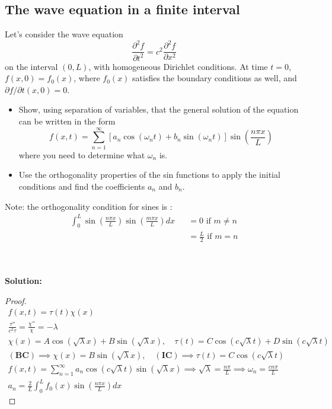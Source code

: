  \subsection{The wave equation in a finite interval}

 Let's consider the wave equation 
\begin{equation}
    \frac{\partial^2 f}{\partial t^2} = c^2 \frac{\partial^2 f}{\partial x^2}
    \label{eq:waveeq}
\end{equation}
on the interval $(0,L)$, with homogeneous Dirichlet conditions. At time $t= 0$, $f(x,0) = f_0(x)$, where $f_0(x)$ satisfies the boundary conditions as well, and $\partial f/\partial t(x,0) = 0$. 

\begin{itemize}
\item Show, using separation of variables, that the general solution of the equation can be written in the form
\begin{equation}
f(x,t) =  \sum_{n=1}^\infty \left[ a_n \cos(\omega_n t) + b_n \sin(\omega_n t)\right] \sin \left( \frac{n\pi x}{L} \right) 
\end{equation} 
where you need to determine what $\omega_n$ is. 
\item Use the orthogonality properties of the sin functions to apply the initial conditions and find the coefficients $a_n$ and $b_n$. 
\end{itemize} 
Note: the orthogonality condition for sines is : 
\begin{eqnarray}
    \int_0^L \sin \left( \frac{n\pi x}{L} \right)  \sin \left( \frac{m\pi x}{L} \right) dx  && = 0 \mbox{ if  } m \neq n   \nonumber \\
    && = \frac{L}{2} \mbox{ if  } m = n 
    \label{eq:sinortho}
\end{eqnarray}
\\
\\
{\color{red} {\bf Solution:

\begin{proof}
    \begin{gather*}
        f(x,t) = \tau(t)\chi(x)\\
        \frac{\tau ''}{c^2\tau} = \frac{\chi ''}{\chi} = -\lambda \\
        \chi(x) = A\cos(\sqrt{\lambda}x) + B\sin(\sqrt{\lambda}x), \quad \tau(t) = C\cos(c\sqrt{\lambda}t) + D\sin(c\sqrt{\lambda}t)\\
        (\mathbf{BC}) \implies \chi(x) = B\sin(\sqrt{\lambda}x), \quad (\mathbf{IC}) \implies \tau(t) = C\cos(c\sqrt{\lambda}t)\\
        f(x,t) = \sum_{n=1}^{\infty} a_n\cos(c\sqrt{\lambda}t)\sin(\sqrt{\lambda}x) \implies \sqrt{\lambda} = \frac{n\pi}{L} \implies \omega_n = \frac{cn\pi}{L}\\
        a_n = \frac{2}{L}\int_0^L f_0(x)\sin\left(\frac{n\pi x}{L}\right)dx
    \end{gather*}
\end{proof}

}}
